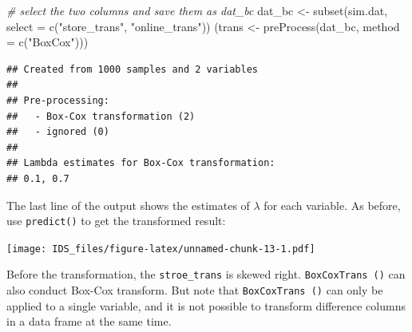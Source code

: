 \documentclass[
  12pt,
]{krantz}
\makeatletter
\newenvironment{Shaded}{\begin{snugshade}}{\end{snugshade}}
\newcommand{\AttributeTok}[1]{\textcolor[rgb]{0.61,0.61,0.61}{#1}}
\newcommand{\CommentTok}[1]{\textcolor[rgb]{0.37,0.37,0.37}{\textit{#1}}}
\newcommand{\DecValTok}[1]{\textcolor[rgb]{0.06,0.06,0.06}{#1}}
\newcommand{\FunctionTok}[1]{\textcolor[rgb]{0,0,0}{#1}}
\newcommand{\NormalTok}[1]{#1}
\newcommand{\OtherTok}[1]{\textcolor[rgb]{0.37,0.37,0.37}{#1}}
\newcommand{\SpecialCharTok}[1]{\textcolor[rgb]{0,0,0}{#1}}
\newcommand{\StringTok}[1]{\textcolor[rgb]{0.5,0.5,0.5}{#1}}
\newenvironment{kframe}{%
\medskip{}
\setlength{\fboxsep}{.8em}
 \def\at@end@of@kframe{}%
 \ifinner\ifhmode%
  \def\at@end@of@kframe{\end{minipage}}%
  \begin{minipage}{\columnwidth}%
 \fi\fi%
 \def\FrameCommand##1{\hskip\@totalleftmargin \hskip-\fboxsep
 \colorbox{shadecolor}{##1}\hskip-\fboxsep
     \hskip-\linewidth \hskip-\@totalleftmargin \hskip\columnwidth}%
 \MakeFramed {\advance\hsize-\width
   \@totalleftmargin\z@ \linewidth\hsize
   \@setminipage}}%
 {\par\unskip\endMakeFramed%
 \at@end@of@kframe}
\renewenvironment{Shaded}{\begin{kframe}}{\end{kframe}}
\makeatother
\begin{document}
\begin{Shaded}
\begin{Highlighting}[]
\CommentTok{\# select the two columns and save them as dat\_bc}
\NormalTok{dat\_bc }\OtherTok{\textless{}{-}} \FunctionTok{subset}\NormalTok{(sim.dat, }\AttributeTok{select =} \FunctionTok{c}\NormalTok{(}\StringTok{"store\_trans"}\NormalTok{, }\StringTok{"online\_trans"}\NormalTok{))}
\NormalTok{(trans }\OtherTok{\textless{}{-}} \FunctionTok{preProcess}\NormalTok{(dat\_bc, }\AttributeTok{method =} \FunctionTok{c}\NormalTok{(}\StringTok{"BoxCox"}\NormalTok{)))}
\end{Highlighting}
\end{Shaded}

\begin{verbatim}
## Created from 1000 samples and 2 variables
## 
## Pre-processing:
##   - Box-Cox transformation (2)
##   - ignored (0)
## 
## Lambda estimates for Box-Cox transformation:
## 0.1, 0.7
\end{verbatim}

The last line of the output shows the estimates of \(\lambda\) for each variable. As before, use \texttt{predict()} to get the transformed result:

\begin{Shaded}
\end{Shaded}

\texttt{[image: IDS\_files/figure-latex/unnamed-chunk-13-1.pdf]}

Before the transformation, the \texttt{stroe\_trans} is skewed right.
\texttt{BoxCoxTrans\ ()} can also conduct Box-Cox transform. But note that \texttt{BoxCoxTrans\ ()} can only be applied to a single variable, and it is not possible to transform difference columns in a data frame at the same time.
\end{document}
